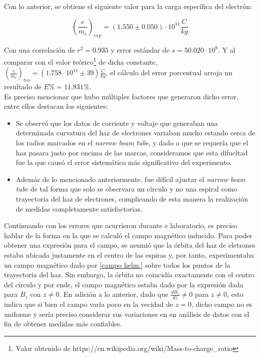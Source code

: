\documentclass[prb,aps,twocolumn,preprintnumbers,amsmath,amssymb]{revtex4}
\begin{document}
Con lo anterior, se obtiene el siguiente valor para la carga específica del electrón:

\begin{equation}
\left( \frac{e}{m_{e}} \right)_{exp} = (1.550 \pm 0.050) \cdot 10^{11} \frac{C}{kg} 
\end{equation}

Con una correlación de $r^2 = 0.935$ y error estándar de $s = 50.020 \cdot 10^{9}$. Y al comparar con el valor teórico\footnote{Valor obtenido de https://en.wikipedia.org/wiki/Mass-to-charge\_ratio} de dicha constante, $\left( \frac{e}{m_{e}} \right)_{teo} = (1.758 \cdot 10^{11}  \pm 39)  \frac{C}{kg}$, el cálculo del error porcentual arroja un resultado de $E\% = 11.831\%$.\\

Es preciso mencionar que hubo múltiples factores que generaron dicho error, entre ellos destacan los siguientes:

\begin{itemize}
	\item Se observó que los datos de corriente y voltaje que generaban una determinada curvatura del haz de electrones variaban mucho estando cerca de los radios marcados en el \textit{narrow beam tube}, y dado a que se requería que el haz pasara justo por encima de las marcas, consideramos que esta difucltad fue la que causó el error sistemático más significativo del experimento.
	
	\item Además de lo mencionado anteriormente, fue difícil ajustar el \textit{narrow beam tube} de tal forma que solo se observara un círculo y no una espiral como trayectoria del haz de electrones, complicando de esta manera la realización de medidas completamente satisfactorias.
\end{itemize}
	
Continuando con los errores que ocurrieron durante e laboratorio, es preciso hablar de la forma en la que se calculó el campo magnético inducido. Para poder obtener una expresión para el campo, se asumió que la órbita del haz de eletrones estaba ubicada justamente en el centro de las espiras y, por tanto, experimentaba un campo magnético dado por \eqref{campo helm.} sobre todos los puntos de la trayectoria del haz. Sin embargo, la órbita no coincidía exactamente con el centro del círculo y por ende, el campo magnético estaba dado por la expresión dada para $B_{z}$ con $z \neq 0$. En adición a lo anterior, dado que $\frac{dB_{z}}{dz} \neq 0$ para $z \neq 0$, esto indica que si bien el campo varía poco en la vecidad de $z = 0$, dicho campo no es uniforme y sería preciso considerar sus variaciones en en análisis de datos con el fin de obtener medidas más confiables.\\  
\end{document}
